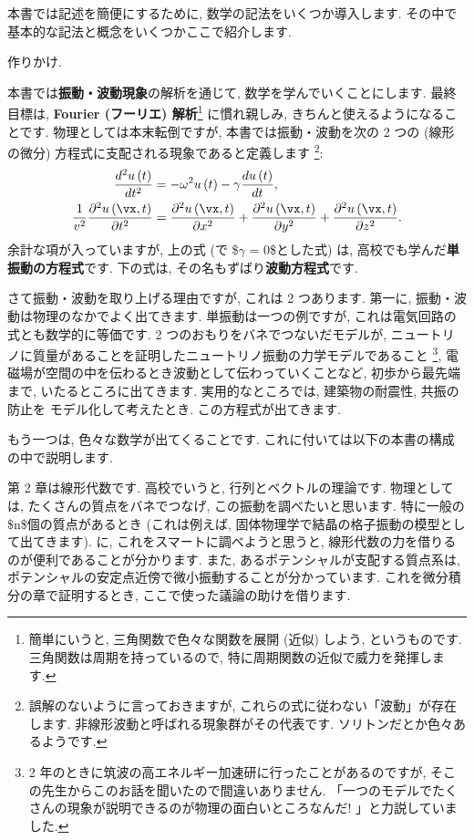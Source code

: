 \documentclass[openany, a4paper, oneside]{book}
\theoremstyle{break}
\theoremstyle{breakdefn}
\newcommand{\rbk}[1]{\left (#1\right)}
\newcommand{\pd}{\partial}
\begin{document}
本書では記述を簡便にするために, 数学の記法をいくつか導入します.
その中で基本的な記法と概念をいくつかここで紹介します.

作りかけ.

本書では\textbf{振動・波動現象}の解析を通じて, 数学を学んでいくことにします.
最終目標は, \textbf{Fourier (フーリエ) 解析}\footnote{簡単にいうと, 三角関数で色々な関数を展開 (近似) しよう, というものです.
三角関数は周期を持っているので, 特に周期関数の近似で威力を発揮します.
 }
に慣れ親しみ, きちんと使えるようになることです.
物理としては本末転倒ですが,
本書では振動・波動を次の 2 つの (線形の微分) 方程式に支配される現象であると定義します \footnote{誤解のないように言っておきますが, これらの式に従わない「波動」が存在します.
非線形波動と呼ばれる現象群がその代表です.
ソリトンだとか色々あるようです.
 }:
\begin{align}
 \frac{d^2 u \rbk{t} }{d t^2}
 &=
 -\omega^2 u \rbk{t} - \gamma \frac{d u \rbk{t}}{dt} , \\
 \frac{1}{v^2} \frac{\pd^2 u \rbk{ \vx , t }}{\pd t^2}
 &=
 \frac{\pd^2 u \rbk{\vx , t}}{\pd x^2} + \frac{\pd^2 u \rbk{\vx , t}}{\pd y^2} + \frac{\pd^2 u \rbk{\vx , t}}{\pd z^2}.
\end{align}
余計な項が入っていますが, 上の式 (で \$$\gamma$ = 0\$とした式) は,
高校でも学んだ\textbf{単振動の方程式}です.
下の式は, その名もずばり\textbf{波動方程式}です.

さて振動・波動を取り上げる理由ですが, これは 2 つあります.
第一に, 振動・波動は物理のなかでよく出てきます.
単振動は一つの例ですが, これは電気回路の式とも数学的に等価です.
2 つのおもりをバネでつないだモデルが,
ニュートリノに質量があることを証明したニュートリノ振動の力学モデルであること \footnote{2 年のときに筑波の高エネルギー加速研に行ったことがあるのですが,
そこの先生からこのお話を聞いたので間違いありません.
「一つのモデルでたくさんの現象が説明できるのが物理の面白いところなんだ! 」と力説していました.
 },
電磁場が空間の中を伝わるとき波動として伝わっていくことなど,
初歩から最先端まで, いたるところに出てきます.
実用的なところでは, 建築物の耐震性, 共振の防止を
モデル化して考えたとき. この方程式が出てきます.

もう一つは, 色々な数学が出てくることです.
これに付いては以下の本書の構成の中で説明します.

第 2 章は線形代数です.
高校でいうと, 行列とベクトルの理論です.
物理としては, たくさんの質点をバネでつなげ, この振動を調べたいと思います.
特に一般の \$n\$個の質点があるとき (これは例えば, 固体物理学で結晶の格子振動の模型として出てきます). に,
これをスマートに調べようと思うと,
線形代数の力を借りるのが便利であることが分かります.
また, あるポテンシャルが支配する質点系は,
ポテンシャルの安定点近傍で微小振動することが分かっています.
これを微分積分の章で証明するとき, ここで使った議論の助けを借ります.
\end{document}
